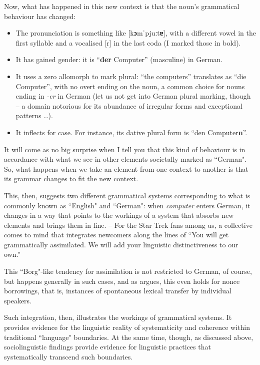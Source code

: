 Now, what has happened in this new context is that the noun’s grammatical behaviour has changed:

\begin{itemize}
\item The pronunciation is something like [k\textbf{ɔ}mˈpjuːt\textbf{ɐ}], with a different vowel in the first syllable and a vocalised [r] in the last coda (I marked those in bold).
\item It has gained gender: it is “\textbf{der} Computer” (masculine) in German.
\item It uses a zero allomorph to mark plural: “the computers” translates as “die Computer”, with no overt ending on the noun, a common choice for nouns ending in \textit{{}-er} in German (let us not get into German plural marking, though – a domain notorious for its abundance of irregular forms and exceptional patterns …).
\item It inflects for case. For instance, its dative plural form is “den Computer\textbf{n}”.
\end{itemize}

It will come as no big surprise when I tell you that this kind of behaviour is in accordance with what we see in other elements societally marked as “German". So, what happens when we take an element from one context to another is that its grammar changes to fit the new context.

This, then, suggests two different grammatical systems corresponding to what is commonly known as “English" and “German": when \textit{computer} enters German, it changes in a way that points to the workings of a system that absorbs new elements and brings them in line. – For the Star Trek fans among us, a collective comes to mind that integrates newcomers along the lines of “You will get grammatically assimilated. We will add your linguistic distinctiveness to our own.”

\hspace*{-3.8pt}This “Borg"-like tendency for assimilation is not restricted to German, of course, but happens generally in such cases, and as \citet{Poplack2018} argues, this even holds for nonce borrowings, that is, instances of spontaneous lexical transfer by individual speakers.

Such integration, then, illustrates the workings of grammatical systems. It provides evidence for the linguistic reality of systematicity and coherence within traditional “language" boundaries. At the same time, though, as discussed above, sociolinguistic findings provide evidence for linguistic practices that systematically transcend such boundaries.

